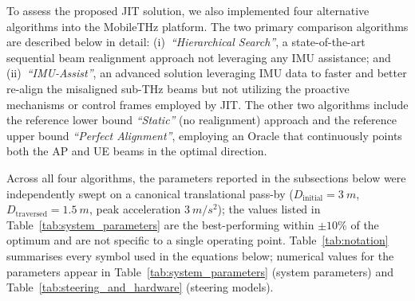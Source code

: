 \documentclass[fleqn,10pt]{wlscirep}
\newcommand{\rev}[1]{#1}
\begin{document}
To assess the proposed JIT solution, we also implemented four alternative algorithms into the MobileTHz platform. The two primary comparison algorithms are described below in detail: (i)~\emph{``Hierarchical Search''}, a state-of-the-art sequential beam realignment approach not leveraging any IMU assistance; and (ii)~\emph{``IMU-Assist''}, an advanced solution leveraging IMU data to faster and better re-align the misaligned sub-THz beams but not utilizing the proactive mechanisms or control frames employed by JIT. The other two algorithms include the reference lower bound \emph{``Static''} (no realignment) approach and the reference upper bound \emph{``Perfect Alignment''}, employing an Oracle that continuously points both the AP and UE beams in the optimal direction.

Across all four algorithms, the parameters reported in the subsections below were independently swept on a canonical translational pass-by ($D_{\text{initial}} = \SI{3}{m}$, $D_{\text{traversed}} = \SI{1.5}{m}$, peak acceleration $\SI{3}{m/s^2}$); the values listed in Table~\ref{tab:system_parameters} are the best-performing within $\pm 10\%$ of the optimum and are not specific to a single operating point. \rev{Table~\ref{tab:notation} summarises every symbol used in the equations below; numerical values for the parameters appear in Table~\ref{tab:system_parameters} (system parameters) and Table~\ref{tab:steering_and_hardware} (steering models).}
\end{document}
